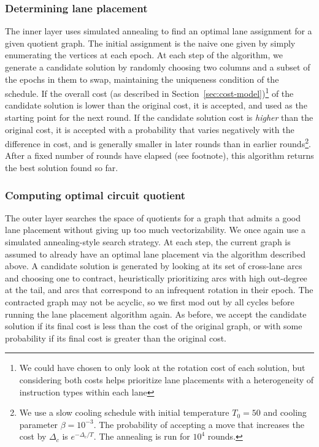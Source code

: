\subsubsection*{Determining lane placement}
The inner layer uses simulated annealing to find an optimal lane assignment for a given quotient graph.
The initial assignment is the naive one given by simply enumerating the vertices at each epoch.
At each step of the algorithm, we generate a candidate solution by randomly choosing two columns and a subset of the epochs in them to swap, maintaining the uniqueness condition of the schedule.
If the overall cost (as described in Section~\ref{sec:cost-model})\footnote{We could have chosen to only look at the rotation cost of each solution, but considering both costs helps prioritize lane placements with a heterogeneity of instruction types within each lane} of the candidate solution is lower than the original cost, it is accepted, and used as the starting point for the next round.
If the candidate solution cost is {\em higher} than the original cost, it is accepted with a probability that varies negatively with the difference in cost, and is generally smaller in later rounds than in earlier rounds\footnote{We use a slow cooling schedule with initial temperature $T_0=50$ and cooling parameter $\beta=10^{-3}$. The probability of accepting a move that increases the cost by $\Delta_c$ is $e^{-\Delta_c/T}$. The annealing is run for $10^4$ rounds.}.
After a fixed number of rounds have elapsed (see footnote), this algorithm returns the best solution found so far.

\subsubsection*{Computing optimal circuit quotient}
The outer layer searches the space of quotients for a graph that admits a good lane placement without giving up too much vectorizability.
We once again use a simulated annealing-style search strategy.
At each step, the current graph is assumed to already have an optimal lane placement via the algorithm described above.
A candidate solution is generated by looking at its set of cross-lane arcs and choosing one to contract, heuristically prioritizing arcs with high out-degree at the tail, and arcs that correspond to an infrequent rotation in their epoch.
The contracted graph may not be acyclic, so we first mod out by all cycles before running the lane placement algorithm again.
As before, we accept the candidate solution if its final cost is less than the cost of the original graph, or with some probability if its final cost is greater than the original cost.

